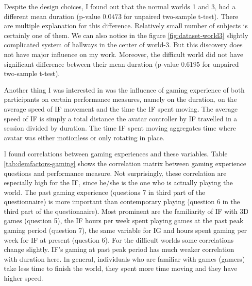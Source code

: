 Despite the design choices, I found out that the normal worlds 1 and 3, had a different mean duration (p-value $0.0473$ for unpaired two-sample t-test). There are multiple explanation for this difference. Relatively small number of subjects is certainly one of them. We can also notice in the figure \ref{fig:dataset-world3} slightly complicated system of hallways in the center of world-3. But this discovery does not have major influence on my work. Moreover, the difficult world did not have significant difference between their mean duration (p-value $0.6195$ for unpaired two-sample t-test).

Another thing I was interested in was the influence of gaming experience of both participants on certain performance measures, namely on the duration, on the average speed of IF movement and the time the IF spent moving. The average speed of IF is simply a total distance the avatar controller by IF travelled in a session divided by duration. The time IF spent moving aggregates time where avatar was either motionless or only rotating in place. 

I found correlations between gaming experiences and these variables. Table \ref{tab:demfactors-gaming} shows the correlation matrix between gaming experience questions and performance measure.  Not surprisingly, these correlation are especially high for the IF, since he/she is the one who is actually playing the world. The past gaming experience (questions 7 in third part of the questionnaire) is more important than contemporary playing (question 6 in the third part of the questionnaire). Most prominent are the familiarity of IF with 3D games (question 5),  the IF hours per week spent playing games at the past peak gaming period (question 7), the same variable for IG and hours spent gaming per week for IF at present (question 6). For the difficult worlds some correlations change slightly. IF's gaming at past peak period has much weaker correlation with duration here. In general, individuals who are familiar with games (gamers) take less time to finish the world, they spent more time moving and they have higher speed.

